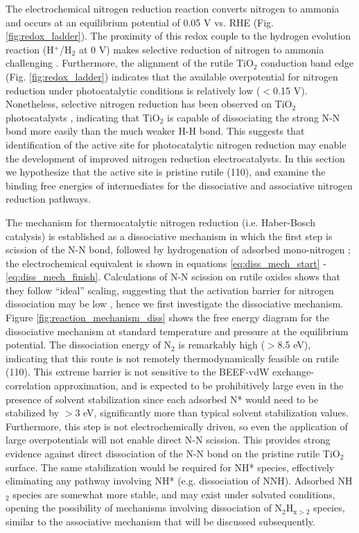 \documentclass[journal=ascecg,manuscript=article,articletitle=true]{achemso}
\begin{document}
The electrochemical nitrogen reduction reaction converts nitrogen to ammonia and occurs at an equilibrium potential of 0.05 V vs. RHE (Fig. \ref{fig:redox_ladder}). The proximity of this redox couple to the hydrogen evolution reaction (H$^+$/H$_2$ at 0 V) makes selective reduction of nitrogen to ammonia challenging \cite{Skulason_2012, Montoya_2015,Singh_2017}. Furthermore, the alignment of the rutile TiO$_2$ conduction band edge (Fig. \ref{fig:redox_ladder}) indicates that the available overpotential for nitrogen reduction under photocatalytic conditions is relatively low ($<$0.15 V).  Nonetheless, selective nitrogen reduction has been observed on TiO$_2$ photocatalysts \cite{Schrauzer_1977, Schrauzer_1983,Schrauzer_2011,Augugliaro_1982}, indicating that TiO$_2$ is capable of dissociating the strong N-N bond more easily than the much weaker H-H bond. This suggests that identification of the active site for photocatalytic nitrogen reduction may enable the development of improved nitrogen reduction electrocatalysts. In this section we hypothesize that the active site is pristine rutile (110), and examine the binding free energies of intermediates for the dissociative and associative nitrogen reduction pathways.

  The mechanism for thermocatalytic nitrogen reduction (i.e. Haber-Bosch catalysis) is established as a dissociative mechanism in which the first step is scission of the N-N bond, followed by hydrogenation of adsorbed mono-nitrogen \cite{Emmett_1933,Ertl_1976,Spencer_1981,Honkala_2005}; the electrochemical equivalent is shown in equations \ref{eq:diss_mech_start} - \ref{eq:diss_mech_finish}. Calculations of N-N scission on rutile oxides shows that they follow ``ideal'' scaling, suggesting that the activation barrier for nitrogen dissociation may be low \cite{Vojvodic_2014}, hence we first investigate the dissociative mechanism. Figure \ref{fig:reaction_mechanism_diss} shows the free energy diagram for the dissociative mechanism at standard temperature and pressure at the equilibrium potential. The dissociation energy of N$_2$ is remarkably high ($>$8.5 eV), indicating that this route is not remotely thermodynamically feasible on rutile (110). This extreme barrier is not sensitive to the BEEF-vdW exchange-correlation approximation, and is expected to be prohibitively large even in the presence of solvent stabilization since each adsorbed N* would need to be stabilized by $>$3 eV, significantly more than typical solvent stabilization values\cite{Karlberg_2007,He_2017,Hellman2017}. Furthermore, this step is not electrochemically driven, so even the application of large overpotentials will not enable direct N-N scission. This provides strong evidence against direct dissociation of the N-N bond on the pristine rutile TiO$_2$ surface. The same stabilization would be required for NH* species, effectively eliminating any pathway involving NH* (e.g. dissociation of NNH). Adsorbed NH$_2$ species are somewhat more stable, and may exist under solvated conditions, opening the possibility of mechanisms involving dissociation of N$_2$H$_{\mathrm{x}>2}$ species, similar to the associative mechanism that will be discussed subsequently.
  
\end{document}
